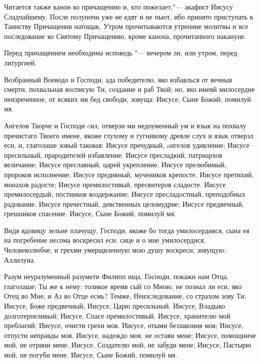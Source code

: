 Читается также канон ко причащению и, кто пожелает,"--- акафист Иисусу Сладчайшему. После полуночи уже не едят и не пьют, ибо принято приступать к Таинству Причащения натощак. Утром прочитываются утренние молитвы и все последование ко Святому Причащению, кроме канона, прочитанного накануне.

Перед причащением необходима исповедь "--- вечером ли, или утром, перед литургией.

\mychapterending

\begin{mymulticols}



Возбранный Воеводо и Господи, ада победителю, яко избавлься от вечныя смерти, похвальная восписую Ти, создание и раб Твой; но, яко имеяй милосердие неизреченное, от всяких мя бед свободи, зовуща: Иисусе, Сыне Божий, помилуй мя.



Ангелов
Творче и Господи cил, отверзи ми недоуменный ум и язык на похвалу пречистаго Твоего имене, якоже глухому и гугнивому древле слух и язык отверзл еси, и, глаголаше зовый таковая: Иисусе пречудный, aнгелов удивление; Иисусе пресильный, прародителей избавление. Иисусе пресладкий, патриархов величание; Иисусе преславный, царей укрепление. Иисусе прелюбимый, пророков исполнение; Иисусе предивный, мучеников крепосте. Иисусе претихий, монахов радосте; Иисусе премилостивый,
пресвитеров сладосте. Иисусе премилосердый, постников воздержание; Иисусе пресладостный, преподобных радование. Иисусе пречестный, девственных целомудрие; Иисусе предвечный, грешников спасение. Иисусе, Сыне Божий, помилуй мя.


Видя
вдовицу зельне плачущу, Господи, якоже бо тогда умилосердився, сына ея на погребение несома воскресил еси; сице и о мне умилосердися, Человеколюбче, и грехми умерщвленную мою душу воскреси, зовущую: Аллилуиа.


Разум
неуразуменный разумети Филипп ища, Господи, покажи нам Отца, глаголаше; Ты же к нему: толикое время сый со Мною, не познал ли еси, яко Отец во Мне, и Аз во Отце есмь? Темже, Неизследованне, со страхом зову Ти: Иисусе, Боже предвечный; Иисусе, Царю пресильный. Иисусе, Владыко долготерпеливый; Иисусе, Спасе премилостивый. Иисусе, хранителю мой преблагий; Иисусе, очисти грехи моя. Иисусе, отыми беззакония моя; Иисусе, отпусти неправды моя. Иисусе, надеждо моя, не остави мене; Иисусе, помощниче мой, не отрини мене. Иисусе, Создателю мой, не забуди
мене; Иисусе, Пастырю мой, не погуби мене. Иисусе, Сыне Божий, помилуй мя.


\end{mymulticols}
